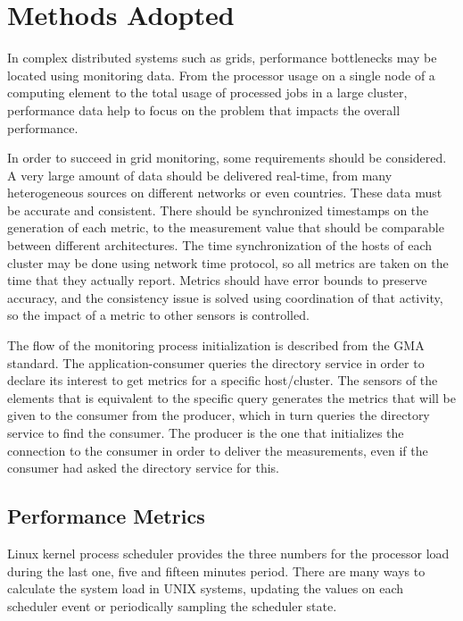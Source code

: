 \section{Methods Adopted}

In complex distributed systems such as grids, performance bottlenecks may be located using monitoring data. From the processor usage on a single node of a computing element to the total usage of processed jobs in a large cluster, performance data help to focus on the problem that impacts the overall performance.

In order to succeed in grid monitoring, some requirements should be considered. A very large amount of data should be delivered real-time, from many heterogeneous sources on different networks or even countries. These data must be accurate and consistent. There should be synchronized timestamps on the generation of each metric, to the measurement value that should be comparable between different architectures. The time synchronization of the hosts of each cluster may be done using network time protocol, so all metrics are taken on the time that they actually report. Metrics should have error bounds to preserve accuracy, and the consistency issue is solved using coordination of that activity, so the impact of a metric to other sensors is controlled.

The flow of the monitoring process initialization is described from the GMA standard. The application-consumer queries the directory service in order to declare its interest to get metrics for a specific host/cluster. The sensors of the elements that is equivalent to the specific query generates the metrics that will be given to the consumer from the producer, which in turn queries the directory service to find the consumer. The producer is the one that initializes the connection to the consumer in order to deliver the measurements, even if the consumer had asked the directory service for this. \cite{balatonuse}


\subsection{Performance Metrics}

Linux kernel process scheduler provides the three numbers for the processor load during the last one, five and fifteen minutes period. There are many ways to calculate the system load in UNIX systems, updating the values on each scheduler event or periodically sampling the scheduler state.


